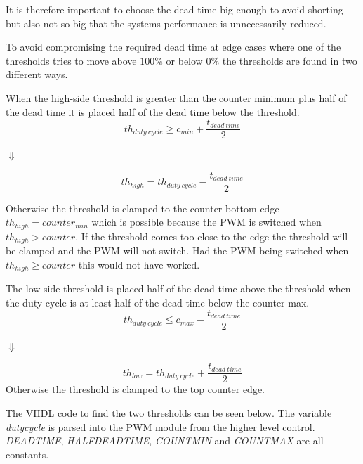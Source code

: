 It is therefore important to choose the dead time big enough to avoid shorting but also not so big that the systems performance is unnecessarily reduced.
\bigskip


To avoid compromising the required dead time at edge cases where one of the thresholds tries to move above $100 \%$ or  below $0 \%$ the thresholds are found in two different ways.





When the high-side threshold is greater than the counter minimum plus half of the dead time it is placed half of the dead time below the threshold.
\begin{equation}
    th_{duty \ cycle} \geq  c_{min} + \frac{t_{dead \ time}}{2}
    \label{eq:threshold_high_condition}
\end{equation}
\begin{center}
    $\Downarrow$    
\end{center}
\begin{equation}
   th_{high} = th_{duty \ cycle} - \frac{t_{dead \ time}}{2}  
   \label{eq:threshold_high_equation}
\end{equation}

Otherwise the threshold is clamped to the counter bottom edge $th_{high} = counter_{min}$ which is possible because the PWM is switched when $th_{high} > counter$.
If the threshold comes too close to the edge the threshold will be clamped and the PWM will not switch. Had the PWM being switched when $th_{high} \geq counter$ this would not have worked.



The low-side threshold is placed half of the dead time above the threshold when the duty cycle is at least half of the dead time below the counter max.
\begin{equation}
    th_{duty \ cycle}\leq c_{max} - \frac{t_{dead \ time}}{2}
    \label{eq:threshold_low_condition}
\end{equation}
\begin{center}
    $\Downarrow$
\end{center}
\begin{equation}
  th_{low} = th_{duty \ cycle} + \frac{t_{dead \ time}}{2}  
  \label{eq:threshold_low_equation}
\end{equation}
Otherwise the threshold is clamped to the top counter edge.

The VHDL code to find the two thresholds can be seen below. The variable \textit{duty\textunderscore cycle} is parsed into the PWM module from the higher level control. \textit{DEADTIME}, \textit{HALF\textunderscore DEADTIME}, \textit{COUNT\textunderscore MIN} and \textit{COUNT\textunderscore MAX} are all constants.

